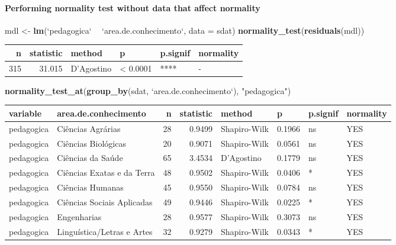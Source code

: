 \documentclass[]{article}
\newenvironment{Shaded}{\begin{snugshade}}{\end{snugshade}}
\newcommand{\DataTypeTok}[1]{\textcolor[rgb]{0.13,0.29,0.53}{#1}}
\newcommand{\KeywordTok}[1]{\textcolor[rgb]{0.13,0.29,0.53}{\textbf{#1}}}
\newcommand{\NormalTok}[1]{#1}
\newcommand{\OperatorTok}[1]{\textcolor[rgb]{0.81,0.36,0.00}{\textbf{#1}}}
\newcommand{\StringTok}[1]{\textcolor[rgb]{0.31,0.60,0.02}{#1}}
\let\oldparagraph\paragraph
\renewcommand{\paragraph}[1]{\oldparagraph{#1}\mbox{}}
\begin{document}
\hypertarget{performing-normality-test-without-data-that-affect-normality}{%
\paragraph{Performing normality test without data that affect
normality}\label{performing-normality-test-without-data-that-affect-normality}}

\begin{Shaded}
\begin{Highlighting}[]
\NormalTok{mdl <-}\StringTok{ }\KeywordTok{lm}\NormalTok{(}\StringTok{`}\DataTypeTok{pedagogica}\StringTok{`} \OperatorTok{~}\StringTok{ `}\DataTypeTok{area.de.conhecimento}\StringTok{`}\NormalTok{, }\DataTypeTok{data =}\NormalTok{ sdat)}
\KeywordTok{normality_test}\NormalTok{(}\KeywordTok{residuals}\NormalTok{(mdl))}
\end{Highlighting}
\end{Shaded}

\begin{longtable}[]{@{}rrllll@{}}
\toprule
n & statistic & method & p & p.signif & normality\tabularnewline
\midrule
\endhead
315 & 31.015 & D'Agostino & \textless{} 0.0001 & **** & -\tabularnewline
\bottomrule
\end{longtable}

\begin{Shaded}
\begin{Highlighting}[]
\KeywordTok{normality_test_at}\NormalTok{(}\KeywordTok{group_by}\NormalTok{(sdat, }\StringTok{`}\DataTypeTok{area.de.conhecimento}\StringTok{`}\NormalTok{), }\StringTok{"pedagogica"}\NormalTok{)}
\end{Highlighting}
\end{Shaded}

\begin{longtable}[]{@{}llrrllll@{}}
\toprule
variable & area.de.conhecimento & n & statistic & method & p & p.signif
& normality\tabularnewline
\midrule
\endhead
pedagogica & Ciências Agrárias & 28 & 0.9499 & Shapiro-Wilk & 0.1966 &
ns & YES\tabularnewline
pedagogica & Ciências Biológicas & 20 & 0.9071 & Shapiro-Wilk & 0.0561 &
ns & YES\tabularnewline
pedagogica & Ciências da Saúde & 65 & 3.4534 & D'Agostino & 0.1779 & ns
& YES\tabularnewline
pedagogica & Ciências Exatas e da Terra & 48 & 0.9502 & Shapiro-Wilk &
0.0406 & * & YES\tabularnewline
pedagogica & Ciências Humanas & 45 & 0.9550 & Shapiro-Wilk & 0.0784 & ns
& YES\tabularnewline
pedagogica & Ciências Sociais Aplicadas & 49 & 0.9446 & Shapiro-Wilk &
0.0225 & * & YES\tabularnewline
pedagogica & Engenharias & 28 & 0.9577 & Shapiro-Wilk & 0.3073 & ns &
YES\tabularnewline
pedagogica & Linguística/Letras e Artes & 32 & 0.9279 & Shapiro-Wilk &
0.0343 & * & YES\tabularnewline
\bottomrule
\end{longtable}
\end{document}
